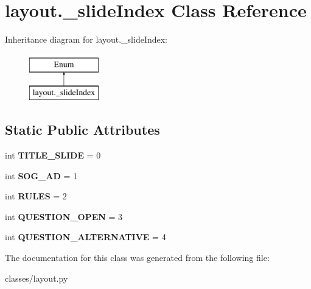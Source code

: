 \hypertarget{classlayout_1_1__slideIndex}{}\section{layout.\+\_\+slide\+Index Class Reference}
\label{classlayout_1_1__slideIndex}
Inheritance diagram for layout.\+\_\+slide\+Index\+:\begin{figure}[H]
\begin{center}
\leavevmode
\includegraphics[height=2.000000cm]{classlayout_1_1__slideIndex}
\end{center}
\end{figure}
\subsection*{Static Public Attributes}
\begin{DoxyCompactItemize}
\item 
\mbox{\label{classlayout_1_1__slideIndex_a7307216672fb3377c1b68ecce786d6f4}} 
int {\bfseries T\+I\+T\+L\+E\+\_\+\+S\+L\+I\+DE} = 0
\item 
\mbox{\label{classlayout_1_1__slideIndex_a126f6d755cda24b09fd00b9eed497704}} 
int {\bfseries S\+O\+G\+\_\+\+AD} = 1
\item 
\mbox{\label{classlayout_1_1__slideIndex_ac8c6d7e6e65d65220ebfb3a1a56e3dfb}} 
int {\bfseries R\+U\+L\+ES} = 2
\item 
\mbox{\label{classlayout_1_1__slideIndex_a104bad61b57f6e8da41d1ab84dbd4e7c}} 
int {\bfseries Q\+U\+E\+S\+T\+I\+O\+N\+\_\+\+O\+P\+EN} = 3
\item 
\mbox{\label{classlayout_1_1__slideIndex_a86d1e4e3338dff8fc55d98ad864f6da7}} 
int {\bfseries Q\+U\+E\+S\+T\+I\+O\+N\+\_\+\+A\+L\+T\+E\+R\+N\+A\+T\+I\+VE} = 4
\end{DoxyCompactItemize}


The documentation for this class was generated from the following file\+:\begin{DoxyCompactItemize}
\item 
classes/layout.\+py\end{DoxyCompactItemize}
